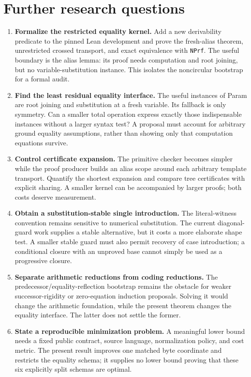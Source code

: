 \documentclass[11pt,letterpaper]{article}
\begin{document}
\section{Further research questions}

\begin{enumerate}
\item \textbf{Formalize the restricted equality kernel.}
Add a new derivability predicate to the pinned Lean development and prove
the fresh-alias theorem, unrestricted crossed transport, and exact
equivalence with \texttt{NPrf}. The useful boundary is the alias lemma:
its proof needs computation and root joining, but no variable-substitution
instance. This isolates the noncircular bootstrap for a formal audit.

\item \textbf{Find the least residual equality interface.}
The useful instances of Param are root joining and substitution at a
fresh variable. Its fallback is only symmetry. Can a smaller total
operation express exactly those indispensable instances without a larger
syntax test? A proposal must account for arbitrary ground equality
assumptions, rather than showing only that computation equations survive.

\item \textbf{Control certificate expansion.}
The primitive checker becomes simpler while the proof producer builds an
alias scope around each arbitrary template transport. Quantify the
shortest expansion and compare tree certificates with explicit sharing.
A smaller kernel can be accompanied by larger proofs; both costs deserve
measurement.

\item \textbf{Obtain a substitution-stable single introduction.}
The literal-witness convention remains sensitive to numerical
substitution. The current diagonal-guard work supplies a stable alternative,
but it costs a more elaborate shape test. A smaller stable guard must also
permit recovery of case introduction; a conditional closure with an
unproved base cannot simply be used as a progressive closure.

\item \textbf{Separate arithmetic reductions from coding reductions.}
The predecessor/equality-reflection bootstrap remains the obstacle for
weaker successor-rigidity or zero-equation induction proposals. Solving it
would change the arithmetic foundation, while the present theorem changes
the equality interface. The latter does not settle the former.

\item \textbf{State a reproducible minimization problem.}
A meaningful lower bound needs a fixed public contract, source language,
normalization policy, and cost metric. The present result improves one
matched byte coordinate and restricts the equality schema; it supplies no
lower bound proving that these six explicitly split schemas are optimal.
\end{enumerate}
\end{document}

